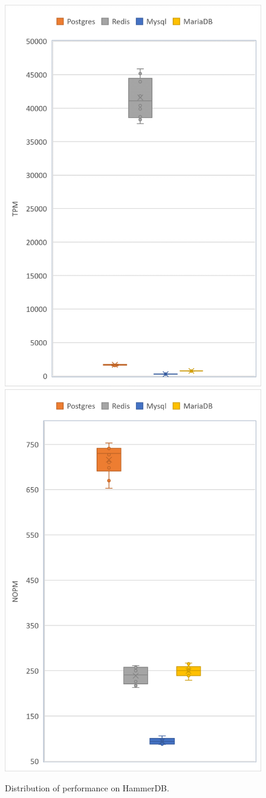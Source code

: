 \begin{figure}[h!]
\centering
\caption{Distribution of performance on HammerDB.}
\includegraphics[width=0.6\columnwidth]{results/boxplot/TPM.png}
\includegraphics[width=0.6\columnwidth]{results/boxplot/NOPM.png}
\label{fig:bocplothammer}	
\end{figure}

